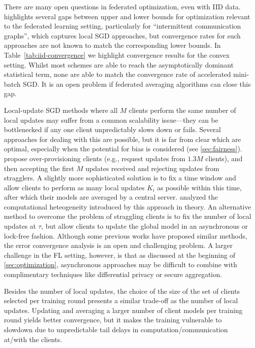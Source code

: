 
There are many open questions in federated optimization, even with IID data. 
\citet{woodworth18graphoracle} highlights several gaps between upper and lower bounds for optimization relevant to the federated learning setting, particularly for ``intermittent communication graphs'', which captures local SGD approaches, but convergence rates for such approaches are not known to match the corresponding lower bounds. In Table~\ref{tab:iid-convergence} we highlight convergence results for the convex setting. Whilst most schemes are able to reach the asymptotically dominant statistical term, none are able to match the convergence rate of accelerated mini-batch SGD. It is an open problem if federated averaging algorithms can close this gap.

Local-update SGD methods where all $M$ clients perform the same number of local updates may suffer from a common scalability issue---they can be bottlenecked if any one client unpredictably slows down or fails. Several approaches for dealing with this are possible, but it is far from clear which are optimal, especially when the potential for bias is considered (see \cref{sec:fairness}). \citet{bonawitz19sysml} propose over-provisioning clients (e.g., request updates from $1.3 M$ clients), and then accepting the first $M$ updates received and rejecting updates from stragglers. A slightly more sophisticated solution is to fix a time window and allow clients to perform as many local updates $K_i$ as possible within this time, after which their models are averaged by a central server. \citet{wang2020tackling} analyzed the computational heteogeneity introduced by this approach in theory. An alternative method to overcome the problem of straggling clients is to fix the number of local updates at $\tau$, but allow clients to update the global model in an asynchronous or lock-free fashion. Although some previous works \citep{zhang2015deep, Lian2018, dutta2018slow} have proposed similar methods, the error convergence analysis is an open and challenging problem. A larger challenge in the FL setting, however, is that as discussed at the beginning of \cref{sec:optimization}, asynchronous approaches may be difficult to combine with complimentary techniques like differential privacy or secure aggregation. 

Besides the number of local updates, the choice of the size of the set of clients selected per training round presents a similar trade-off as the number of local updates. Updating and averaging a larger number of client models per training round yields better convergence, but it makes the training vulnerable to slowdown due to unpredictable tail delays in computation/communication at/with the clients. 

